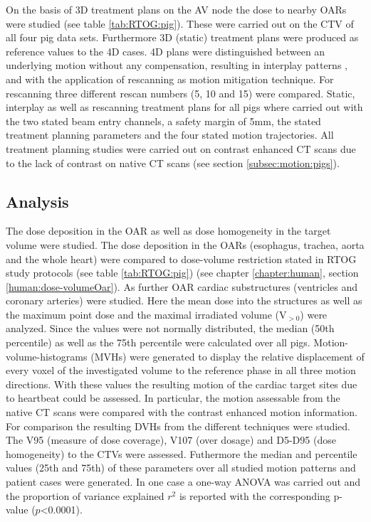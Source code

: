 On the basis of 3D treatment plans on the AV node the dose to nearby OARs were studied (see table \ref{tab:RTOG:pig}). 
These were carried out on the CTV of all four pig data sets. Furthermore 3D (static) treatment plans were produced as reference values to the 
4D cases. 4D plans were distinguished between an underlying motion without any compensation, resulting in interplay patterns \cite{Phi92, Ber08}, 
and with the application of rescanning \cite{Phi92} as motion mitigation technique. For rescanning three different rescan 
numbers (5, 10 and 15) were compared.
Static, interplay as well as rescanning treatment plans for all pigs where carried out with the two stated beam entry channels,
a safety margin of 5mm, the stated treatment planning parameters and the four stated motion trajectories. 
All treatment planning studies were carried out on contrast enhanced CT scans due to the lack of contrast on native CT scans (see section 
\ref{subsec:motion:pigs}). 


\subsection{Analysis}

The dose deposition in the OAR as well as dose homogeneity in the target volume were studied. The dose deposition in the OARs 
(esophagus, trachea, aorta and the whole heart) were compared to dose-volume restriction stated in RTOG study protocols 
(see table \ref{tab:RTOG:pig}) \cite{RTOG0631, RTOG0915} (see chapter \ref{chapter:human}, section \ref{human:dose-volumeOar}). 
As further OAR cardiac substructures (ventricles and coronary arteries) were studied. Here the mean dose into the structures as well as the 
maximum point dose and the maximal irradiated volume (V$_{>0}$) were analyzed. Since the values were not normally distributed, the 
median (50th percentile) as well as the 75th percentile were calculated over all pigs. 
Motion-volume-histograms (MVHs) \cite{Ric13} were generated to display the relative displacement of every 
voxel of the investigated volume to the reference phase in all three motion directions. With these values the resulting motion of the cardiac 
target sites due to heartbeat could be assessed. In particular, the motion assessable from the native CT scans were compared with the contrast 
enhanced motion information. For comparison the resulting DVHs from the different techniques were studied. The V95 (measure of dose 
coverage), V107 (over dosage) and D5-D95 (dose homogeneity) to the CTVs were assessed. Futhermore the median and percentile values 
(25th and 75th) of these parameters over all studied motion patterns and patient cases were generated. In one case a one-way ANOVA was carried out 
and the proportion of variance explained $r^{2}$ is reported with the corresponding p-value ($p$<0.0001). 

